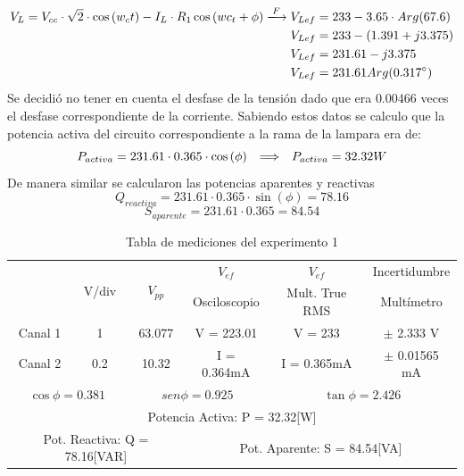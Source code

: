 \begin{equation*}
\begin{aligned}
    V_{L}=V_{cc}\cdot\sqrt{2}\cdot\cos{(w_ct)}-I_L\cdot R_1\cos{(wc_t+\phi)}\xlongrightarrow{F}V_{Lef}&=233-3.65\cdot Arg(67.6)\\
    V_{Lef}&=233-(1.391+j3.375)\\
    V_{Lef}&=231.61-j3.375\\
    V_{Lef}&=231.61 Arg(0.317^\circ)
\end{aligned}
\end{equation*}
Se decidió no tener en cuenta el desfase de la tensión dado que era $0.00466$ veces el desfase correspondiente de la corriente.
Sabiendo estos datos se calculo que la potencia activa del circuito correspondiente a la rama de la lampara era de:
\begin{equation*}
    P_{activa}=231.61\cdot0.365\cdot\cos{(\phi)}\hspace{0.25cm} \Longrightarrow \hspace{0.25cm} P_{activa}=32.32 W
\end{equation*}
De manera similar se calcularon las potencias aparentes  y reactivas
\begin{equation*}
    Q_{reactiva}=231.61\cdot0.365\cdot\sin{(\phi)}=78.16
\end{equation*}
\begin{equation*}
    S_{aparente}=231.61\cdot0.365=84.54
\end{equation*}
\begin{table}[H]
    \centering
    \begin{tabular}{|c|c|c|c|c|c|}
    \hline
        & \multirow{2}{*}{V/div} & \multirow{2}{*}{$V_{pp}$} & $V_{ef}$  & $V_{ef}$ & Incertidumbre \\
        ~ &  &  & Osciloscopio & Mult. True RMS &  Multímetro \\ 
        \hline
        Canal 1 & 1 & 63.077 & V = 223.01   & V = 233 & $\pm$ 2.333 V\\ 
        \hline
        Canal 2 & 0.2 & 10.32 &  I  = 0.364mA   & I = 0.365mA & $\pm$ 0.01565 mA \\ 
        \hline
        \multicolumn{2}{|c|}{$\cos\phi=0.381$} & \multicolumn{2}{c|}{$sen\phi=0.925$} &
        \multicolumn{2}{c|}{$\tan\phi=2.426$}\\ 
        \hline
        \multicolumn{6}{|c|}{Potencia Activa: P = 32.32[W]}\\
        \hline
        \multicolumn{3}{|c|}{Pot. Reactiva: Q = 78.16[VAR]} & \multicolumn{3}{c|}{Pot. Aparente: S = 84.54[VA]}\\ \hline
    \end{tabular}
    \def\tablename{Tabla} 
    \caption{Tabla de mediciones del experimento 1}
    \label{tab:exp1}
\end{table}